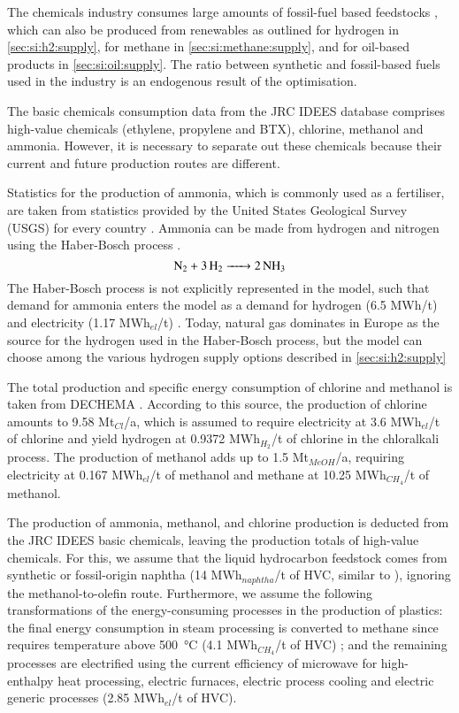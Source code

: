 The chemicals industry consumes large amounts of fossil-fuel based feedstocks
, which can also be produced from renewables as
outlined for hydrogen in \cref{sec:si:h2:supply}, for methane in
\cref{sec:si:methane:supply}, and for oil-based products in
\cref{sec:si:oil:supply}. The ratio between synthetic and fossil-based fuels
used in the industry is an endogenous result of the optimisation.

The basic chemicals consumption data from the JRC IDEES \cite{IDEES} database
comprises high-value chemicals (ethylene, propylene and BTX), chlorine, methanol
and ammonia. However, it is necessary to separate out these chemicals because
their current and future production routes are different.

Statistics for the production of ammonia, which is commonly used as a
fertiliser, are taken from statistics provided by the United States Geological
Survey (USGS) for every country \citeS{}. Ammonia can be made from hydrogen and
nitrogen using the Haber-Bosch process .
\begin{equation}
    \ce{N2 + 3H2 -> 2NH3}
\end{equation}
The Haber-Bosch process is not explicitly represented in the model, such that
demand for ammonia enters the model as a demand for hydrogen (6.5
MWh/t) and electricity (1.17 MWh$_{el}$/t)
. Today, natural gas dominates in Europe as the source for
the hydrogen used in the Haber-Bosch process, but the model can choose among the
various hydrogen supply options described in
\cref{sec:si:h2:supply}

The total production and specific energy consumption of chlorine and methanol is
taken from DECHEMA . According to this
source, the production of chlorine amounts to 9.58 Mt$_{Cl}$/a, which is assumed
to require electricity at 3.6 MWh$_{el}$/t of chlorine and yield hydrogen at
0.9372 MWh$_{H_2}$/t of chlorine in the chloralkali process. The production of
methanol adds up to 1.5 Mt$_{MeOH}$/a, requiring electricity at 0.167 MWh$_{el}$/t
of methanol and methane at 10.25 MWh$_{CH_4}$/t of methanol.

The production of ammonia, methanol, and chlorine production is deducted from
the JRC IDEES basic chemicals, leaving the production totals of high-value
chemicals. For this, we assume that the liquid hydrocarbon feedstock comes from
synthetic or fossil-origin naphtha (14 MWh$_{naphtha}$/t of HVC, similar to
), ignoring the methanol-to-olefin
route. Furthermore, we assume the following transformations of the
energy-consuming processes in the production of plastics: the final energy
consumption in steam processing is converted to methane since requires
temperature above \SI{500}{\celsius} (4.1 MWh$_{CH_4}$/t of HVC)
; and the remaining processes are
electrified using the current efficiency of microwave for high-enthalpy heat
processing, electric furnaces, electric process cooling and electric generic
processes (2.85 MWh$_{el}$/t of HVC).


